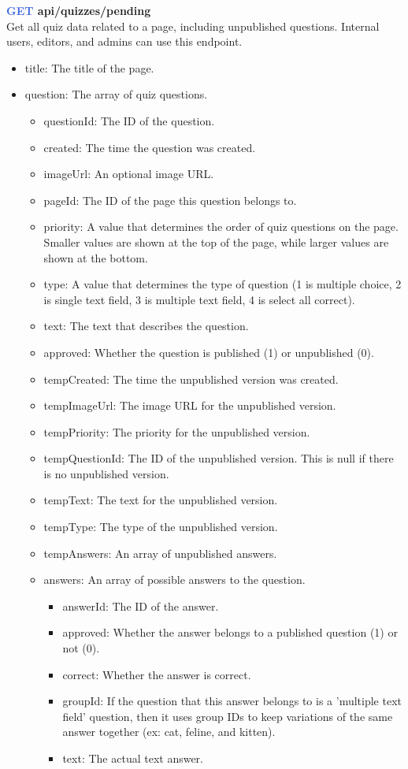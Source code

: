 \documentclass[onecolumn, draftclsnofoot,10pt, compsoc, usenames, dvipsnames]{IEEEtran}
\begin{document}
\noindent
\textbf{\textcolor{RoyalBlue}{GET} api/quizzes/pending} \\
Get all quiz data related to a page, including unpublished questions. Internal users, editors, and admins can use this endpoint.
\begin{itemize}
    \item title: The title of the page.
    \item question: The array of quiz questions.
    \begin{itemize}
        \item questionId: The ID of the question.
        \item created: The time the question was created.
        \item imageUrl: An optional image URL.
        \item pageId: The ID of the page this question belongs to.
        \item priority: A value that determines the order of quiz questions on the page. Smaller values are shown at the top of the page, while larger values are shown at the bottom.
        \item type: A value that determines the type of question (1 is multiple choice, 2 is single text field, 3 is multiple text field, 4 is select all correct).
        \item text: The text that describes the question.
        \item approved: Whether the question is published (1) or unpublished (0).
        \item tempCreated: The time the unpublished version was created.
        \item tempImageUrl: The image URL for the unpublished version.
        \item tempPriority: The priority for the unpublished version.
        \item tempQuestionId: The ID of the unpublished version. This is null if there is no unpublished version.
        \item tempText: The text for the unpublished version.
        \item tempType: The type of the unpublished version.
        \item tempAnswers: An array of unpublished answers.
        \item answers: An array of possible answers to the question.
            \begin{itemize}
              \item answerId: The ID of the answer.
              \item approved: Whether the answer belongs to a published question (1) or not (0).
              \item correct: Whether the answer is correct.
              \item groupId: If the question that this answer belongs to is a 'multiple text field' question, then it uses group IDs to keep variations of the same answer together (ex: cat, feline, and kitten).
              \item text: The actual text answer.
            \end{itemize}
    \end{itemize}
\end{itemize}
\end{document}
